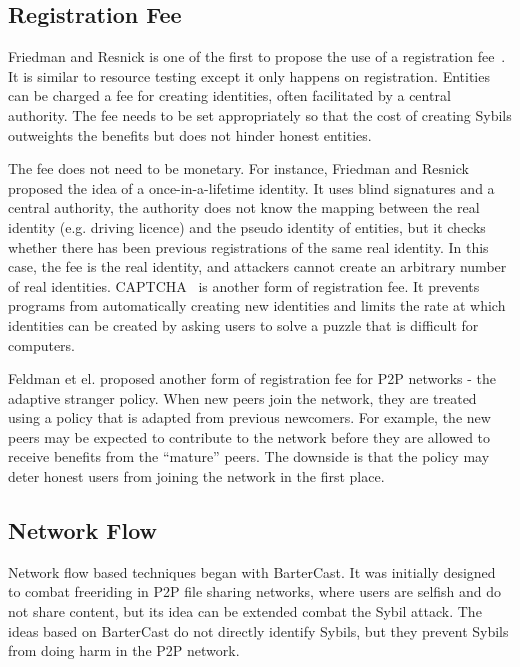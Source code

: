 
\subsection{Registration Fee}\label{sec:registration-fee}

Friedman and Resnick is one of the first to propose the use of a registration
fee~\cite{resnick2001social}. It is similar to resource testing except it only
happens on registration. Entities can be charged a fee for creating identities,
often facilitated by a central authority. The fee needs to be set appropriately
so that the cost of creating Sybils outweights the benefits but does not hinder
honest entities.

The fee does not need to be monetary. For instance, Friedman and Resnick
proposed the idea of a once-in-a-lifetime identity\cite{resnick2001social}. It
uses blind signatures and a central authority, the authority does not know the
mapping between the real identity (e.g. driving licence) and the pseudo identity
of entities, but it checks whether there has been previous registrations of the
same real identity. In this case, the fee is the real identity, and attackers
cannot create an arbitrary number of real identities.
CAPTCHA~\cite{von2003captcha} is another form of registration fee. It prevents
programs from automatically creating new identities and limits the rate at which
identities can be created by asking users to solve a puzzle that is difficult
for computers.

Feldman et el. proposed another form of registration fee for P2P networks - the
adaptive stranger policy\cite{feldman2004robust}. When new peers join the
network, they are treated using a policy that is adapted from previous
newcomers. For example, the new peers may be expected to contribute to the
network before they are allowed to receive benefits from the ``mature'' peers.
The downside is that the policy may deter honest users from joining the network
in the first place.


\subsection{Network Flow}\label{sec:network-flow}
Network flow based techniques began with
BarterCast\cite{meulpolder2009bartercast}. It was initially designed to combat
freeriding in P2P file sharing networks, where users are selfish and do not
share content, but its idea can be extended combat the Sybil attack. The ideas
based on BarterCast do not directly identify Sybils, but they prevent Sybils
from doing harm in the P2P network.

